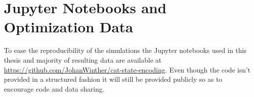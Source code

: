 \documentclass[main.tex]{subfiles}
\begin{document}
\newpage
\section{Jupyter Notebooks and Optimization Data}
\label{sec:jupyter}
To ease the reproducibility of the simulations the Jupyter notebooks used in this thesis and majority of resulting data are available at \url{https://github.com/JohanWinther/cat-state-encoding}.
Even though the code isn't provided in a structured fashion it will still be provided publicly so as to encourage code and data sharing.
\end{document}
